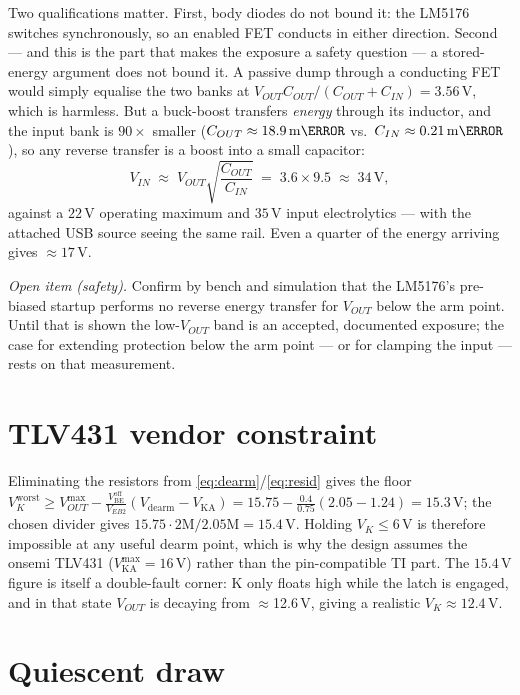 \documentclass[11pt]{article}
\newcommand{\volt}{\mathrm{V}}\newcommand{\ampere}{\mathrm{A}}
\newcommand{\SI}[2]{\ensuremath{#1\,#2}}
\newcommand{\Vbe}{V_{\mathrm{BE}}}
\newcommand{\Vka}{V_{\mathrm{KA}}}
\newcommand{\Vout}{V_{OUT}}
\begin{document}
Two qualifications matter. First, body diodes do not bound it: the LM5176
switches synchronously, so an enabled FET conducts in either direction.
Second --- and this is the part that makes the exposure a safety question --- a
stored-energy argument does not bound it. A passive dump through a conducting
FET would simply equalise the two banks at
$\Vout C_{OUT}/(C_{OUT}{+}C_{IN})=\SI{3.56}{\volt}$, which is harmless. But a
buck-boost transfers \emph{energy} through its inductor, and the input bank is
$90\times$ smaller ($C_{OUT}\approx\SI{18.9}{\milli\farad}$ vs.\
$C_{IN}\approx\SI{0.21}{\milli\farad}$), so any reverse transfer is a boost
into a small capacitor:
\begin{equation}
V_{IN}\;\approx\;\Vout\sqrt{\frac{C_{OUT}}{C_{IN}}}
\;=\;3.6\times9.5\;\approx\;\SI{34}{\volt},
\end{equation}
against a \SI{22}{\volt} operating maximum and \SI{35}{\volt} input
electrolytics --- with the attached USB source seeing the same rail. Even a
quarter of the energy arriving gives $\approx\SI{17}{\volt}$.

\emph{Open item (safety).} Confirm by bench and simulation that the LM5176's
pre-biased startup performs no reverse energy transfer for $\Vout$ below the
arm point. Until that is shown the low-$\Vout$ band is an accepted, documented
exposure; the case for extending protection below the arm point --- or for
clamping the input --- rests on that measurement.

\section{TLV431 vendor constraint}

Eliminating the resistors from \eqref{eq:dearm}/\eqref{eq:resid} gives the floor
$V_K^{\mathrm{worst}}\ge V_{OUT}^{\max}-\tfrac{\Vbe^{\mathrm{off}}}{V_{EB2}}
(V_{\mathrm{dearm}}-\Vka)=15.75-\tfrac{0.4}{0.75}(2.05-1.24)=\SI{15.3}{\volt}$;
the chosen divider gives $15.75\cdot2\mathrm{M}/2.05\mathrm{M}=\SI{15.4}{\volt}$.
Holding $V_K\le\SI{6}{\volt}$ is therefore impossible at any useful dearm
point, which is why the design assumes the onsemi TLV431
($\Vka^{\max}=\SI{16}{\volt}$) rather than the pin-compatible TI part. The
\SI{15.4}{\volt} figure is itself a double-fault corner: K only floats high
while the latch is engaged, and in that state $\Vout$ is decaying from
$\approx$12.6\,V, giving a realistic $V_K\approx\SI{12.4}{\volt}$.

\section{Quiescent draw}
\end{document}
